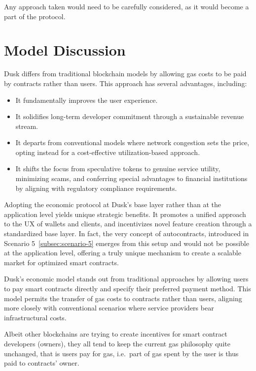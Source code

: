\documentclass[twocolumn, nofootinbib]{revtex4-2} %
\begin{document}
    Any approach taken would need to be carefully considered, as it would
    become a part of the protocol.

    \section*{Model Discussion}\label{sec:discussion}
    Dusk differs from traditional blockchain models by allowing gas costs to be
    paid by contracts rather than users.
    This approach has several advantages, including:

    \begin{itemize}
        \item It fundamentally improves the user experience.
        \item It solidifies long-term developer commitment through a sustainable
              revenue stream.
        \item It departs from conventional models where network congestion sets
              the price, opting instead for a cost-effective utilization-based
              approach.
        \item It shifts the focus from speculative tokens to genuine service
              utility, minimizing scams, and conferring special advantages to
              financial institutions by aligning with regulatory compliance
              requirements.
    \end{itemize}

    Adopting the economic protocol at Dusk's base layer rather than at the
    application level yields unique strategic benefits.
    It promotes a unified approach to the UX of wallets and clients, and
    incentivizes novel feature creation through a standardized base layer.
    In fact, the very concept of autocontracts, introduced in Scenario 5~\ref{subsec:scenario-5}
    emerges from this setup and would not be possible at the application level,
    offering a truly unique mechanism to create a scalable market for optimized
    smart contracts.

    Dusk's economic model stands out from traditional approaches by allowing
    users to pay smart contracts directly and specify their preferred payment
    method.
    This model permits the transfer of gas costs to contracts rather than users,
    aligning more closely with conventional scenarios where service providers
    bear infrastructural costs.

    Albeit other blockchains are trying to create incentives for smart contract
    developers (owners), they all tend to keep the current gas philosophy quite
    unchanged, that is users pay for gas, i.e.\ part of gas spent by the user is
    thus paid to contracts' owner.\\
\end{document}
